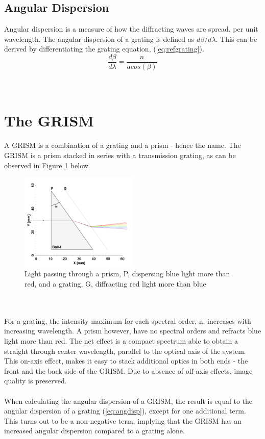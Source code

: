 \subsection{Angular Dispersion}
Angular dispersion is a measure of how the diffracting waves are spread, per unit wavelength. The angular dispersion of a grating is defined as $d\beta/d\lambda$. This can be derived by differentiating the grating equation, (\ref{eq:refgrating}). 
\begin{equation}
    \frac{d\beta}{d\lambda} = \frac{n}{a cos(\beta)}
    \label{eq:angdisp}
\end{equation}
\\\\
\section{The GRISM} \label{sec:grism}
A GRISM is a combination of a grating and a prism - hence the name. The GRISM is a prism stacked in series with a transmission grating, as can be observed in Figure \ref{fig:grism} below.
\begin{figure}[H]
    \centering
    \includegraphics[width=0.5\textwidth]{Images/theory/GRISM.png}
    \caption{Light passing through a prism, P, dispersing blue light more than red, and a grating, G, diffracting red light more than blue}
    \label{fig:grism}
\end{figure}
\\\\
\noindent
For a grating, the intensity maximum for each spectral order, n, increases with increasing wavelength. A prism however, have no spectral orders and refracts blue light more than red. The net effect is a compact spectrum able to obtain a straight through center wavelength, parallel to the optical axis of the system. This on-axis effect, makes it easy to stack additional optics in both ends - the front and the back side of the GRISM. Due to absence of off-axis effects, image quality is preserved.
\\\\
When calculating the angular dispersion of a GRISM, the result is equal to the angular dispersion of a grating (\ref{eq:angdisp}), except for one additional term. This turns out to be a non-negative term, implying that the GRISM has an increased angular dispersion compared to a grating alone.


